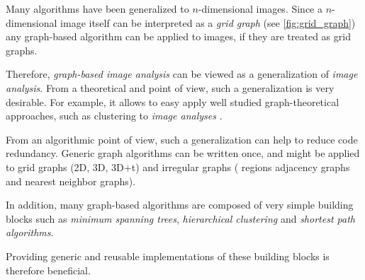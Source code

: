 
Many algorithms have been generalized to $n$-dimensional images.
Since a $n$-dimensional image itself can be interpreted as a \emph{grid graph}  (see \cref{fig:grid_graph}) any graph-based algorithm can be applied to images, if they are treated as grid graphs.

Therefore, \emph{graph-based image analysis} can be viewed as a generalization of \emph{image analysis}.
From a theoretical and  point of view, such a generalization is very desirable.
For example, it allows to easy apply well studied graph-theoretical approaches, such as clustering
to  \emph{image analyses} \cite{vlachos_1993_csv,arbelaez_2006_cvpr,ohlander_1978_cgip}.

From an algorithmic point of view, such a generalization can help to reduce 
code redundancy.
Generic graph algorithms can be written once, and might be applied 
to grid graphs (2D, 3D, 3D+t) and irregular graphs ( \eg \quad regions adjacency graphs and nearest neighbor graphs).

In addition, many graph-based algorithms are composed  of
very simple building blocks such
as \emph{minimum spanning trees}, \emph{hierarchical clustering} and 
\emph{shortest path algorithms}. 

Providing generic and reusable implementations of these building blocks
 is therefore beneficial.






